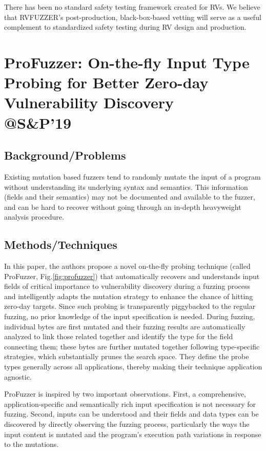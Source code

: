 There has been no standard safety testing framework created for RVs. We believe that RVFUZZER’s post-production, black-box-based vetting will serve as a useful complement to standardized safety testing during RV design and production.

\newpage
\section{ProFuzzer: On-the-fly Input Type Probing for Better
Zero-day Vulnerability Discovery \\@S\&P'19}
\subsection{Background/Problems}
Existing mutation based fuzzers tend to randomly mutate the input of a program without understanding its underlying syntax and semantics.  This information (fields and their semantics) may not be documented and available to the fuzzer, and can be hard to recover without going through an in-depth heavyweight analysis procedure. 
\subsection{Methods/Techniques}
 In this paper, the authors propose a novel on-the-fly probing technique (called ProFuzzer, Fig.\ref{fig:profuzzer}) that automatically recovers and understands input fields of critical importance to vulnerability discovery during a fuzzing process and intelligently adapts the mutation strategy to enhance the chance of hitting zero-day targets. Since such probing is transparently piggybacked to the regular fuzzing, no prior knowledge of the input specification is needed. During fuzzing, individual bytes are first mutated and their fuzzing results are automatically analyzed to link those related together and identify the type for the field connecting them; these bytes are further mutated together following type-specific strategies, which substantially prunes the search space.  They define the probe types generally across all applications, thereby making their technique application agnostic.

ProFuzzer is inspired by two important observations. First, a comprehensive, application-specific and semantically rich input specification is not necessary for fuzzing.  Second, inputs can be understood and their fields and data types can be discovered by directly observing the fuzzing process, particularly the ways the input content is mutated and the program’s execution path variations in response to the mutations. 

